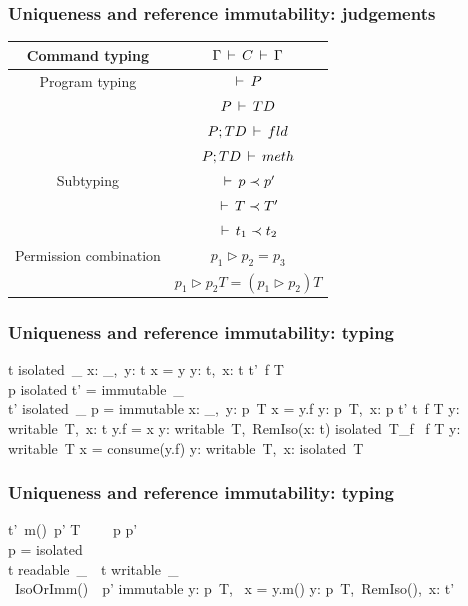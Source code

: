 \begin{frame}
    \frametitle{Uniqueness and reference immutability: judgements}
    \begin{center}
    \begin{tabular}{c | c}
    Command typing & $\Gamma \,\vdash\, C \,\vdash\, \Gamma$ \\
                   \hline

    Program typing & $\,\vdash\, P$          \\
                   & $P \,\vdash\, TD$       \\
                   & $P; TD \,\vdash\, fld$  \\
                   & $P; TD \,\vdash\, meth$ \\
                   \hline

    Subtyping & $\,\vdash\, p \prec p'$    \\
              & $\,\vdash\, T \prec T'$    \\
              & $\,\vdash\, t_1 \prec t_2$ \\
              \hline

    Permission combination & $p_1 \rhd p_2 = p_3$                \\
                           & $p_1 \rhd p_2 T = (p_1 \rhd p_2) T$ \\
    \end{tabular}
    \end{center}
\end{frame}

\begin{frame}
    \frametitle{Uniqueness and reference immutability: typing}
    \infrule
    {
        t \neq isolated\ \_
    }
    {
        x: \_,\ y: t \ts x = y \rts y: t,\ x: t
    }
    \infrule
    {
        t'\ f \in T \\
        p \neq isolated \vee t' = immutable\ \_ \\
        t' \neq isolated\ \_ \vee p = immutable
    }
    {
        x: \_,\ y: p\ T
        \ts x = y.f
        \rts y: p\ T,\ x: p \triangleright t'
    }
    \infrule
    {
        t\ f \in T
    }
    {
        y: writable\ T,\ x: t
        \ts y.f = x
        \rts y: writable\ T,\ RemIso(x: t)
    }
    \infrule
    {
        isolated\ T_f \ f \in T
    }
    {
        y: writable\ T
        \ts x = consume(y.f)
        \rts y: writable\ T,\ x: isolated\ T
    }
\end{frame}

\begin{frame}
    \frametitle{Uniqueness and reference immutability: typing}
    \infrule
    {
        t'\ m()\ p' \in T \ \ \ \
        \ts p \prec p' \ \ \ \
         \\
        p = isolated \Rightarrow \\
                 t \neq readable\ \_\
        \wedge\  t \neq writable\ \_\\
        \wedge\  IsoOrImm(\seq{z: t})\
        \wedge\  p' \neq immutable
    }
    {
        y: p\ T,\ \seq{z: u}
        \ts x = y.m(\seq{z})
        \rts y: p\ T,\ RemIso(),\ x: t'
    }
\end{frame}

